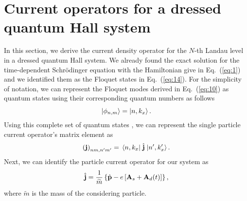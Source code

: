 \documentclass[
 reprint,
 amsmath,amssymb,
 aps,
 prb,
]{revtex4-2}
\begin{document}
{\color{Red}
\section{\label{appendix_d} Current operators for a dressed quantum Hall system}

In this section, we derive the current density operator for the $N$-th Landau level in a dressed quantum Hall system. We already found the exact solution for the time-dependent Schrödinger equation with the Hamiltonian give in Eq.~(\ref{eq:1}) and we identified them as the Floquet states in Eq.~(\ref{eq:14}). For the simplicity of notation, we can represent the Floquet modes derived in Eq.~(\ref{eq:10}) as quantum states using their corresponding quantum numbers as follows
\begin{equation} \label{eq:d1}
  \ket{\phi_{n,m}} = \ket{n,k_x}.
\end{equation}
Using this complete set of quantum states \cite{wackerl20,holthaus15,grifoni98}, we can represent the single particle current operator's matrix element as
\begin{equation} \label{eq:d2}
  \left(\vb{j} \right)_{nm,n'm'} = \mel{n,k_x}{\;\hat{\vb{j}}\;}{n',k'_x}.
\end{equation}
Next, we can identify the particle current operator for our system \cite{mahan00,bruus04} as
\begin{equation} \label{eq:d3}
  \hat{\vb{j}} = \frac{1}{\widetilde{m}} \left\{\hat{\vb{p}} - e\left[\vb{A}_s + \vb{A}_d(t) \right]\right\},
\end{equation}
where $\widetilde{m}$ is the mass of the considering particle.

}
\end{document}
